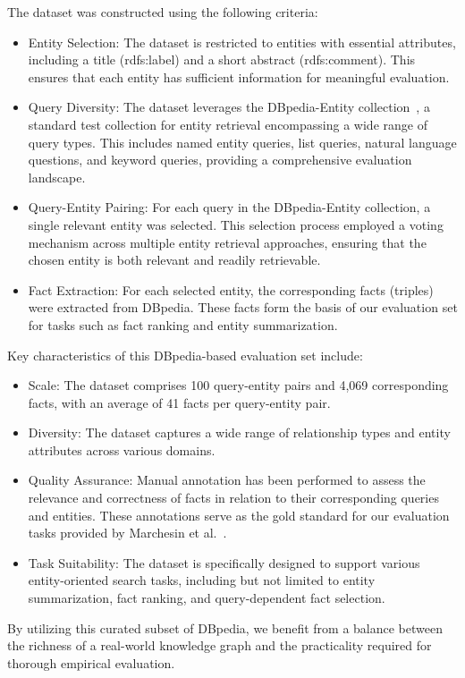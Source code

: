 The dataset was constructed using the following criteria:
\begin{itemize}
    \item Entity Selection: The dataset is restricted to entities with essential attributes, including a title (rdfs:label) and a short abstract (rdfs:comment). This ensures that each entity has sufficient information for meaningful evaluation.
    \item Query Diversity: The dataset leverages the DBpedia-Entity collection~\cite{10.1145/2484028.2484165}, a standard test collection for entity retrieval encompassing a wide range of query types. This includes named entity queries, list queries, natural language questions, and keyword queries, providing a comprehensive evaluation landscape.
    \item Query-Entity Pairing: For each query in the DBpedia-Entity collection, a single relevant entity was selected. This selection process employed a voting mechanism across multiple entity retrieval approaches, ensuring that the chosen entity is both relevant and readily retrievable.
    \item Fact Extraction: For each selected entity, the corresponding facts (triples) were extracted from DBpedia. These facts form the basis of our evaluation set for tasks such as fact ranking and entity summarization.
\end{itemize}

Key characteristics of this DBpedia-based evaluation set include:
\begin{itemize}
    \item Scale: The dataset comprises 100 query-entity pairs and 4,069 corresponding facts, with an average of 41 facts per query-entity pair.
    \item Diversity: The dataset captures a wide range of relationship types and entity attributes across various domains.
    \item Quality Assurance: Manual annotation has been performed to assess the relevance and correctness of facts in relation to their corresponding queries and entities. These annotations serve as the gold standard for our evaluation tasks provided by Marchesin et al.~\cite{marchesin_etal-cikm2024}.
    \item Task Suitability: The dataset is specifically designed to support various entity-oriented search tasks, including but not limited to entity summarization, fact ranking, and query-dependent fact selection.
\end{itemize}
By utilizing this curated subset of DBpedia, we benefit from a balance between the richness of a real-world knowledge graph and the practicality required for thorough empirical evaluation.

